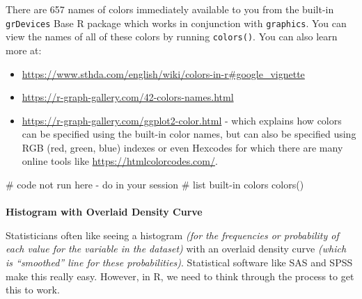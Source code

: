 \documentclass[
  letterpaper,
  DIV=11,
  numbers=noendperiod]{scrartcl}
\makeatletter
\let\oldparagraph\paragraph
\renewcommand{\paragraph}{
    \@ifstar
      \xxxParagraphStar
      \xxxParagraphNoStar
  }
\newcommand{\xxxParagraphStar}[1]{\oldparagraph*{#1}\mbox{}}
\newcommand{\xxxParagraphNoStar}[1]{\oldparagraph{#1}\mbox{}}
\newenvironment{Shaded}{\begin{snugshade}}{\end{snugshade}}
\newcommand{\CommentTok}[1]{\textcolor[rgb]{0.37,0.37,0.37}{#1}}
\newcommand{\FunctionTok}[1]{\textcolor[rgb]{0.28,0.35,0.67}{#1}}
\newcommand{\NormalTok}[1]{\textcolor[rgb]{0.00,0.23,0.31}{#1}}
\providecommand{\tightlist}{%
  \setlength{\itemsep}{0pt}\setlength{\parskip}{0pt}}\usepackage{longtable,booktabs,array}
\makeatother
\begin{document}
\begin{tcolorbox}[enhanced jigsaw, arc=.35mm, colback=white, rightrule=.15mm, toprule=.15mm, colframe=quarto-callout-tip-color-frame, opacityback=0, breakable, titlerule=0mm, left=2mm, title=\textcolor{quarto-callout-tip-color}{\faLightbulb}\hspace{0.5em}{Colors available}, toptitle=1mm, opacitybacktitle=0.6, bottomtitle=1mm, leftrule=.75mm, bottomrule=.15mm, coltitle=black, colbacktitle=quarto-callout-tip-color!10!white]

There are 657 names of colors immediately available to you from the
built-in \texttt{grDevices} Base R package which works in conjunction
with \texttt{graphics}. You can view the names of all of these colors by
running \texttt{colors()}. You can also learn more at:

\begin{itemize}
\tightlist
\item
  \url{https://www.sthda.com/english/wiki/colors-in-r\#google_vignette}
\item
  \url{https://r-graph-gallery.com/42-colors-names.html}
\item
  \url{https://r-graph-gallery.com/ggplot2-color.html} - which explains
  how colors can be specified using the built-in color names, but can
  also be specified using RGB (red, green, blue) indexes or even
  Hexcodes for which there are many online tools like
  \url{https://htmlcolorcodes.com/}.
\end{itemize}

\end{tcolorbox}

\begin{Shaded}
\begin{Highlighting}[]
\CommentTok{\# code not run here {-} do in your session}
\CommentTok{\# list built{-}in colors}
\FunctionTok{colors}\NormalTok{()}
\end{Highlighting}
\end{Shaded}

\newpage

\paragraph{\texorpdfstring{\textbf{Histogram with Overlaid Density
Curve}}{Histogram with Overlaid Density Curve}}\label{histogram-with-overlaid-density-curve}

Statisticians often like seeing a histogram \emph{(for the frequencies
or probability of each value for the variable in the dataset)} with an
overlaid density curve \emph{(which is ``smoothed'' line for these
probabilities)}. Statistical software like SAS and SPSS make this really
easy. However, in R, we need to think through the process to get this to
work.
\end{document}
